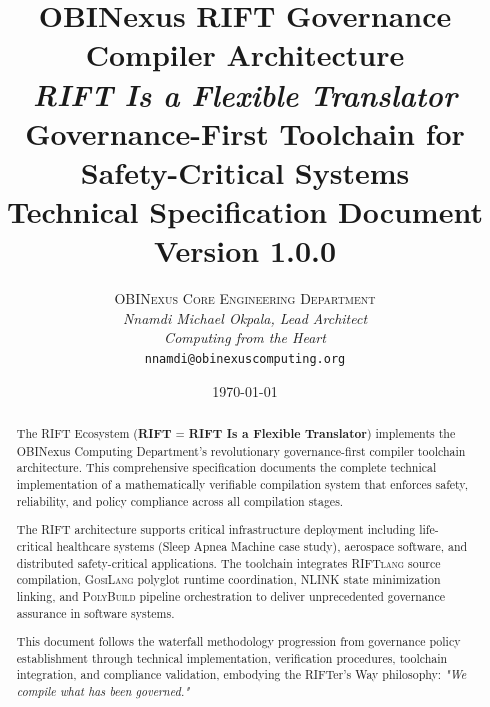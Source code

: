\documentclass[12pt,a4paper]{report}
\title{
    \vspace{-1cm}
    \Huge\textbf{OBINexus RIFT Governance}\\
    \Huge\textbf{Compiler Architecture}\\[0.4cm]
    \Large\textit{RIFT Is a Flexible Translator}\\[0.4cm]
    \large Governance-First Toolchain for Safety-Critical Systems\\[0.4cm]
    \normalsize Technical Specification Document\\
    \normalsize Version 1.0.0
}
\author{
    \textsc{OBINexus Core Engineering Department}\\[0.2cm]
    \textit{Nnamdi Michael Okpala, Lead Architect}\\[0.1cm]
    \textit{Computing from the Heart}\\[0.3cm]
    \small\texttt{nnamdi@obinexuscomputing.org}
}
\date{\today}
\newcommand{\riftlang}{\textsc{RIFTlang}}
\newcommand{\gosilang}{\textsc{GosiLang}}
\newcommand{\nlink}{\textsc{NLINK}}
\newcommand{\polybuild}{\textsc{PolyBuild}}
\theoremstyle{definition}
\theoremstyle{remark}
\begin{document}
\maketitle
\thispagestyle{empty}

\begin{abstract}
The RIFT Ecosystem (\textbf{RIFT} = \textbf{RIFT Is a Flexible Translator}) implements the OBINexus Computing Department's revolutionary governance-first compiler toolchain architecture. This comprehensive specification documents the complete technical implementation of a mathematically verifiable compilation system that enforces safety, reliability, and policy compliance across all compilation stages.

The RIFT architecture supports critical infrastructure deployment including life-critical healthcare systems (Sleep Apnea Machine case study), aerospace software, and distributed safety-critical applications. The toolchain integrates \riftlang{} source compilation, \gosilang{} polyglot runtime coordination, \nlink{} state minimization linking, and \polybuild{} pipeline orchestration to deliver unprecedented governance assurance in software systems.

This document follows the waterfall methodology progression from governance policy establishment through technical implementation, verification procedures, toolchain integration, and compliance validation, embodying the RIFTer's Way philosophy: \textit{"We compile what has been governed."}
\end{abstract}

\newpage

\tableofcontents
\newpage

% 
% 

\end{document}

